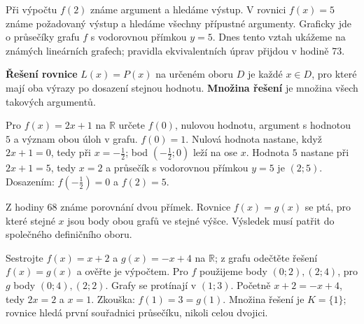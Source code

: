 \documentclass[11pt,a4paper]{article}
\begin{document}
Při výpočtu $f(2)$ známe argument a hledáme výstup. V rovnici $f(x)=5$ známe požadovaný výstup a hledáme všechny přípustné argumenty. Graficky jde o průsečíky grafu $f$ s vodorovnou přímkou $y=5$. Dnes tento vztah ukážeme na známých lineárních grafech; pravidla ekvivalentních úprav přijdou v hodině 73.
\begin{definiceBox}
\textbf{Řešení rovnice} $L(x)=P(x)$ na určeném oboru $D$ je každé $x\in D$, pro které mají oba výrazy po dosazení stejnou hodnotu. \textbf{Množina řešení} je množina všech takových argumentů.
\end{definiceBox}
\begin{prikladReseniBox}
Pro $f(x)=2x+1$ na $\mathbb R$ určete $f(0)$, nulovou hodnotu, argument s hodnotou $5$ a význam obou úloh v grafu.
\tcblower
$f(0)=1$. Nulová hodnota nastane, když $2x+1=0$, tedy při $x=-\frac12$; bod $(-\frac12;0)$ leží na ose $x$. Hodnota $5$ nastane při $2x+1=5$, tedy $x=2$ a průsečík s vodorovnou přímkou $y=5$ je $(2;5)$. Dosazením: $f(-\frac12)=0$ a $f(2)=5$.
\end{prikladReseniBox}
Z hodiny 68 známe porovnání dvou přímek. Rovnice $f(x)=g(x)$ se ptá, pro které stejné $x$ jsou body obou grafů ve stejné výšce. Výsledek musí patřit do společného definičního oboru.
\begin{prikladReseniBox}
Sestrojte $f(x)=x+2$ a $g(x)=-x+4$ na $\mathbb R$; z grafu odečtěte řešení $f(x)=g(x)$ a ověřte je výpočtem.
\tcblower
Pro $f$ použijeme body $(0;2),(2;4)$, pro $g$ body $(0;4),(2;2)$. Grafy se protínají v $(1;3)$. Početně $x+2=-x+4$, tedy $2x=2$ a $x=1$. Zkouška: $f(1)=3=g(1)$. Množina řešení je $K=\{1\}$; rovnice hledá první souřadnici průsečíku, nikoli celou dvojici.
\end{prikladReseniBox}
\begin{center}
\end{center}
\end{document}
